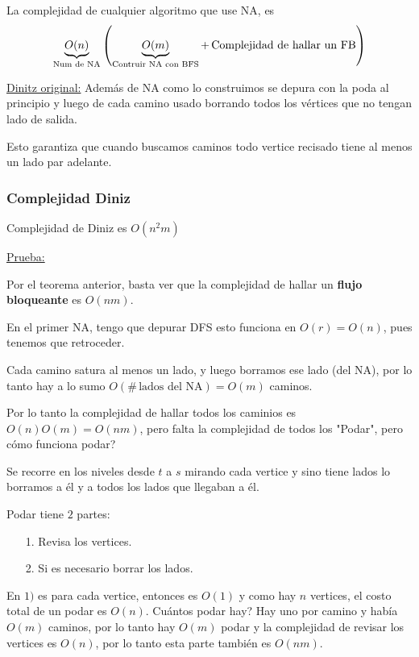 \documentclass[12pt,a4paper]{article}
\begin{document}
\begin{corolario} La complejidad de cualquier algoritmo que use NA, es 
    $$\underbrace{O(n)}_{\text{Num de NA}}\left(\underbrace{O(m)}_{\text{Contruir NA con BFS}} + \,\text{Complejidad de hallar un FB}\right)$$
\end{corolario}

\underline{Dinitz original:} Además de NA como lo construimos se depura con la 
poda al principio y luego de cada camino usado borrando todos los vértices que 
no tengan lado de salida.
\medskip

Esto garantiza que cuando buscamos caminos todo vertice recisado tiene al menos 
un lado par adelante.

\subsubsection{Complejidad Diniz}
\begin{teorema} Complejidad de Diniz es $O(n^{2}m)$
\end{teorema}

\underline{Prueba:}
\medskip

Por el teorema anterior, basta ver que la complejidad de hallar un \textbf{flujo bloqueante} 
es $O(nm)$.
\medskip

En el primer NA, tengo que depurar DFS esto funciona en $O(r) = O(n)$, pues tenemos 
que retroceder.
\medskip

Cada camino satura al menos un lado, y luego borramos ese lado (del NA), por lo 
tanto hay a lo sumo $O(\# \,\text{lados del NA}) = O(m)$ caminos.
\medskip

Por lo tanto la complejidad de hallar todos los caminios es $O(n)O(m) = O(nm)$, 
pero falta la complejidad de todos los "Podar", pero cómo funciona podar?
\medskip

Se recorre en los niveles desde $t$ a $s$ mirando cada vertice y sino tiene lados 
lo borramos a él y a todos los lados que llegaban a él.
\medskip

Podar tiene $2$ partes:
\begin{itemize}
    \item [1.] Revisa los vertices.
    \item [2.] Si es necesario borrar los lados.
\end{itemize}

En $1)$ es para cada vertice, entonces es $O(1)$ y como hay $n$ vertices, el costo total 
de un podar es $O(n)$. Cuántos podar hay? Hay uno por camino y había $O(m)$ caminos,
por lo tanto hay $O(m)$ podar y la complejidad de revisar los vertices es $O(n)$,
por lo tanto esta parte también es $O(nm)$.
\medskip
\end{document}
